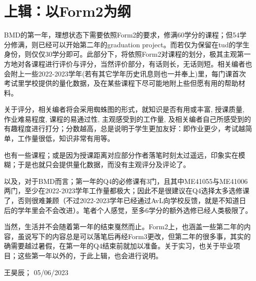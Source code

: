 \section{ 上辑：以Form2为纲}
BMD的第一年，理想状态下需要依照Form2的要求，修满60学分的课程；但54学分修满，则已经可以开始第二年的graduation project。而若仅为保留在tud的学生身份，则仅仅30学分即可。此部分下，将依照Form2对课程的划分，极其主观第一方地对各课程进行评价与评分，当然评价部分，有话则长，无话则短。相关编者也会附上一些2022-2023学年(若有其它学年历史讯息则也一并奉上)里，每门课首次考试里学校提供的量化数据，及在某些课程下尽可能地附上些但愿有用的帮助材料。

关于评分，相关编者将会采用蜘蛛图的形式，就知识是否有用或丰富, 授课质量, 作业难易程度, 课程的易通过性, 主观感受到的工作量, 及相关编者自己所感受到的有趣程度进行打分；分数越高，总是说明于学生更加友好：即作业更少，考试越简单，工作量很低，知识非常有用等。

也有一些课程；或是因为授课距离对应部分作者落笔时刻太过遥远，印象实在模糊；于是也就只会提供量化数据，而没有主观评分及评论了。

以及，对于BMD而言；第一年的Q4的必修课有3门，且其中ME41055与ME41006两门，至少在2022-2023学年工作量都极大；因此不是很建议在Q4选择太多选修课了，否则很难兼顾（不过2022-2023学年已经通过AvL向学校反馈，就是不知道日后的学年里会不会改进）。笔者个人感觉，至多6学分的额外选修已经人类极限了。

当然，生活并不会随着第一年的结束戛然而止。Form2上，也涵盖一些第二年的内容，虽说写下的内容总是可以落笔后再经Form3更改，但第二年的很多事，其实的确需要越过暑假，在第一年的Q4结束前就加以准备。关于实习，也关于毕业项目；这些第一年以外的，于此上辑，也会进行说明。
\begin{flushright}
王昊辰； 05/06/2023
\end{flushright}









